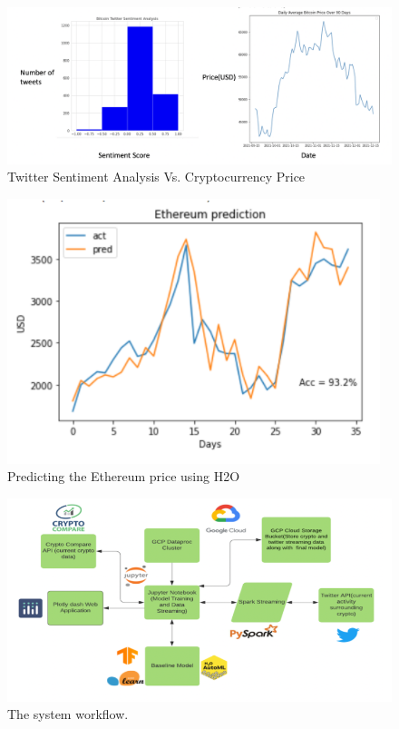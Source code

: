 \documentclass[final]{cvpr}
\begin{document}
\begin{figure}[h!]
\begin{center}
\includegraphics[width=0.8\linewidth]{latex/TSA.png}
\end{center}
   \caption{Twitter Sentiment Analysis Vs. Cryptocurrency Price}
\label{fig:long}
\end{figure}


\begin{figure}[h!]
\begin{center}
\caption{Predicting the Ethereum price using H2O}
\includegraphics[width=0.8\linewidth]{latex/H2O_eth.PNG}
\end{center}
\label{fig:h2oeth}
\end{figure}

\begin{figure}[h!]
\begin{center}
\includegraphics[width=0.8\linewidth]{latex/workflow_complete.PNG}
\end{center}
   \caption{The system workflow.}
\label{fig:short}
\end{figure}
\end{document}
